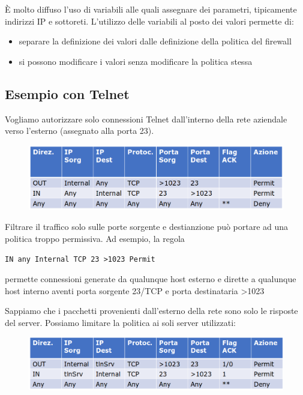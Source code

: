 \noindent È molto diffuso l'uso di variabili alle quali assegnare dei parametri, tipicamente indirizzi IP e sottoreti. L'utilizzo delle variabili 
al posto dei valori permette di:
\begin{itemize}
    \item separare la definizione dei valori dalle definizione della politica del firewall
    \item si possono modificare i valori senza modificare la politica stessa
\end{itemize}

\subsection{Esempio con Telnet}
Vogliamo autorizzare solo connessioni Telnet dall'interno della rete aziendale verso 
l'esterno (assegnato alla porta 23).

\begin{figure}[H]
    \centering
    \includegraphics[width=1\linewidth]{chapters/11/images/telnet1.png}
\end{figure}

\noindent Filtrare il traffico solo sulle porte sorgente e destianzione può 
portare ad una politica troppo permissiva. Ad esempio, la regola 

\begin{center}
    \texttt{IN any Internal TCP 23 >1023 Permit} 
\end{center}

\noindent permette connessioni generate da qualunque host esterno e dirette a qualunque host interno 
aventi porta sorgente 23/TCP e porta destinataria >1023

\noindent Sappiamo che i pacchetti provenienti dall'esterno della rete sono solo
le risposte del server. Possiamo limitare la politica ai soli server utilizzati:

\begin{figure}[H]
    \centering
    \includegraphics[width=1\linewidth]{chapters/11/images/telnet2.png}
\end{figure}

